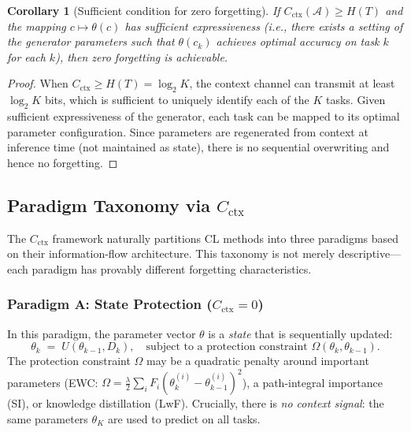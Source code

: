 \documentclass{article}
\newtheorem{corollary}[theorem]{Corollary}
\begin{document}
\begin{corollary}[Sufficient condition for zero forgetting]
\label{cor:sufficient}
If $C_\mathrm{ctx}(\mathcal{A}) \geq H(T)$ and the mapping $c \mapsto \theta(c)$ has sufficient expressiveness (i.e., there exists a setting of the generator parameters such that $\theta(c_k)$ achieves optimal accuracy on task $k$ for each $k$), then zero forgetting is achievable.
\end{corollary}

\begin{proof}
When $C_\mathrm{ctx} \geq H(T) = \log_2 K$, the context channel can transmit at least $\log_2 K$ bits, which is sufficient to uniquely identify each of the $K$ tasks. Given sufficient expressiveness of the generator, each task can be mapped to its optimal parameter configuration. Since parameters are regenerated from context at inference time (not maintained as state), there is no sequential overwriting and hence no forgetting.
\end{proof}


\subsection{Paradigm Taxonomy via $C_\mathrm{ctx}$}
\label{sec:taxonomy}

The $C_\mathrm{ctx}$ framework naturally partitions CL methods into three paradigms based on their information-flow architecture. This taxonomy is not merely descriptive---each paradigm has provably different forgetting characteristics.

\subsubsection{Paradigm A: State Protection ($C_\mathrm{ctx} = 0$)}
\label{sec:paradigm_a}

In this paradigm, the parameter vector $\theta$ is a \emph{state} that is sequentially updated:
\begin{equation}
    \theta_k \;=\; U(\theta_{k-1}, D_k), \quad \text{subject to a protection constraint } \Omega(\theta_k, \theta_{k-1}).
\end{equation}
The protection constraint $\Omega$ may be a quadratic penalty around important parameters (EWC: $\Omega = \tfrac{\lambda}{2} \sum_i F_i (\theta_k^{(i)} - \theta_{k-1}^{(i)})^2$), a path-integral importance (SI), or knowledge distillation (LwF). Crucially, there is \emph{no context signal}: the same parameters $\theta_K$ are used to predict on all tasks.
\end{document}
